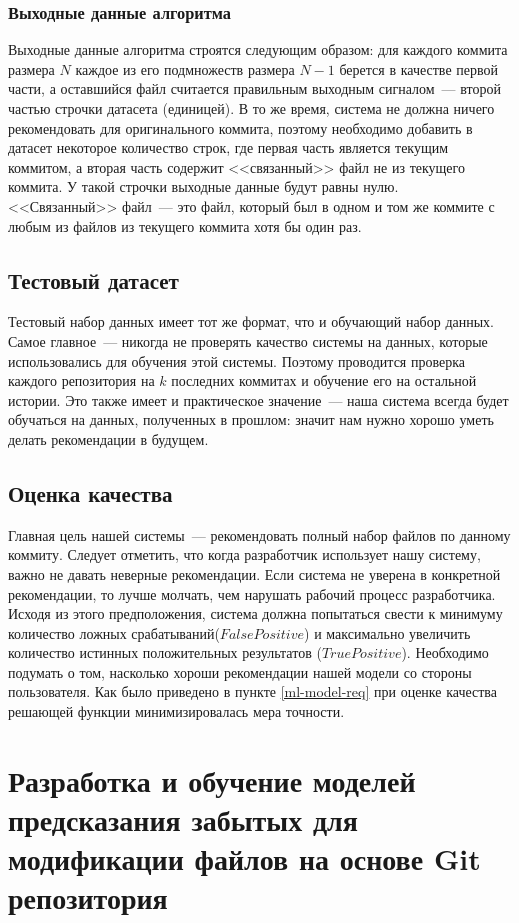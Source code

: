     \subsubsection{Выходные данные алгоритма}\label{related-files-intro}
 Выходные данные алгоритма строятся следующим образом: для каждого коммита размера $N$ каждое из его подмножеств размера $N - 1$ берется в качестве первой части, а оставшийся файл считается правильным выходным сигналом~--- второй частью строчки датасета (единицей). В то же время, система не должна ничего рекомендовать для оригинального коммита, поэтому необходимо добавить в датасет некоторое количество строк, где первая часть является текущим коммитом, а вторая часть содержит <<связанный>> файл не из текущего коммита. У такой строчки выходные данные будут равны нулю. <<Связанный>> файл~--- это файл, который был в одном и том же коммите с любым из файлов из текущего коммита хотя бы один раз.
    \subsection{Тестовый датасет}
Тестовый набор данных имеет тот же формат, что и обучающий набор данных. Самое главное~--- никогда не проверять качество системы на данных, которые использовались для обучения этой системы. Поэтому проводится проверка каждого репозитория на $k$ последних коммитах и обучение его на остальной истории. Это также имеет и практическое значение~--- наша система всегда будет обучаться на данных, полученных в прошлом: значит нам нужно хорошо уметь делать рекомендации в будущем.
    \subsection{Оценка качества}
Главная цель нашей системы~--- рекомендовать полный набор файлов по данному коммиту. Следует отметить, что когда разработчик использует нашу систему, важно не давать неверные рекомендации. Если система не уверена в конкретной рекомендации, то лучше молчать, чем нарушать рабочий процесс разработчика. Исходя из этого предположения, система должна попытаться свести к минимуму количество ложных срабатываний($FalsePositive$) и максимально увеличить количество истинных положительных результатов ($TruePositive$). Необходимо подумать о том, насколько хороши рекомендации нашей модели со стороны пользователя. Как было приведено в пункте \ref{ml-model-req} при оценке качества решающей функции минимизировалась мера точности.

\section{Разработка и обучение моделей предсказания забытых для модификации файлов на основе Git репозитория}
